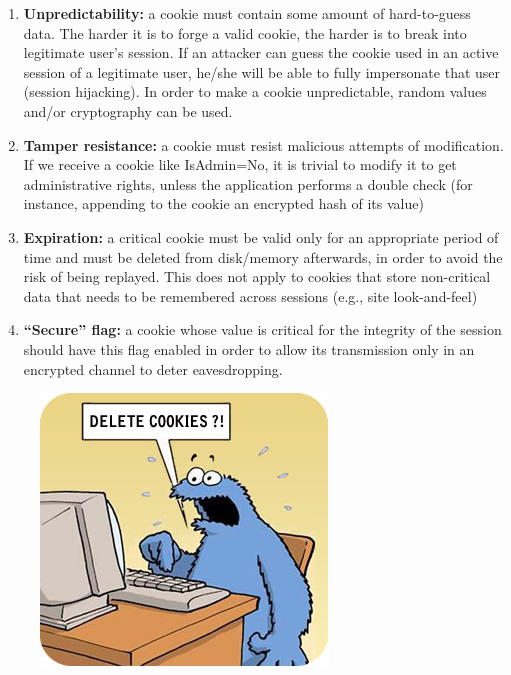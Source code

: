 				\begin{enumerate}
					\item {\bf Unpredictability:} a cookie must contain some amount of hard-to-guess 
					data. The harder it is to forge a valid cookie, the harder is to break into 
					legitimate user's session. If an attacker can guess the cookie used in an active 
					session of a legitimate user, he/she will be able to fully impersonate that user 
					(session hijacking). In order to make a cookie unpredictable, random values 
					and/or cryptography can be used.
					\item {\bf Tamper resistance:} a cookie must resist malicious attempts of 
					modification. If we receive a cookie like IsAdmin=No,  it is trivial to modify it 
					to get administrative rights, unless the application performs a double check 
					(for instance, appending to the cookie an encrypted hash of its value)
					\item {\bf Expiration:} a critical cookie must be valid only for an appropriate 
					period of time and must be deleted from disk/memory afterwards, in order to avoid 
					the risk of being replayed. This does not apply to cookies that store non-critical 
					data that needs to be remembered across sessions (e.g., site look-and-feel)
					\item {\bf “Secure” flag:} a cookie whose value is critical for the integrity of 
					the session should have this flag enabled in order to allow its transmission only 
					in an encrypted channel to deter eavesdropping.
				\end{enumerate}

				\begin{figure}[H]
					\centering
					\includegraphics[scale=0.5]{pics/deleteCookies.jpg}
				\end{figure}

